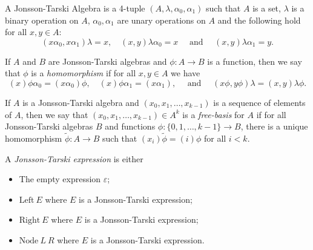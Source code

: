 \begin{definition}\label{def:Jonsson-Tarski_Algebra}
    A Jonsson-Tarski Algebra is a 4-tuple \((A,\lambda,\alpha_0,\alpha_1)\) such that \(A\) is a set, \(\lambda\) is a binary operation on \(A\), \(\alpha_0, \alpha_1\) are unary operations on \(A\) and the following hold for all \(x,y\in A\):
    \[(x\alpha_0, x\alpha_1)\lambda = x, \quad (x,y)\lambda\alpha_0=x \quad \text{ and }\quad(x,y)\lambda\alpha_1=y.\]
\end{definition}
\begin{definition}\label{def:jt_homomorphism}
    If \(A\) and \(B\) are Jonsson-Tarski algebras and \(\phi:A\to B\) is a function, then we say that \(\phi\) is a \emph{homomorphism} if for all \(x,y\in A \) we have
    \[(x)\phi\alpha_0=(x\alpha_0)\phi, \quad (x)\phi\alpha_1=(x\alpha_1), \quad \text{ and }\quad (x\phi,y\phi )\lambda= (x,y)\lambda \phi.\]
\end{definition}
\begin{definition}\label{def:free_basis_jt}
If \(A\) is a Jonsson-Tarski algebra and \((x_0, x_1,\ldots, x_{k-1})\) is a sequence of elements of \(A\), then we say that \((x_0, x_1,\ldots, x_{k-1})\in A^k\) is a \emph{free-basis} for \(A\) if for all Jonsson-Tarski algebras \(B\) and functions \(\phi:\{0,1,\ldots, k-1\}\to B\), there is a unique homomorphism \(\tilde{\phi}:A \to B\) such that \((x_i)\tilde{\phi}=(i)\phi\) for all \(i<k\).
\end{definition}

\begin{definition}\label{def:jt_expression}

A \emph{Jonsson-Tarski expression} is either
\begin{itemize}
    \item The empty expression \(
    \varepsilon
    \);
    \item \(\text{Left}\ E\) where \(E\) is a Jonsson-Tarski expression;
    \item \(\text{Right}\ E\) where \(E\) is a Jonsson-Tarski expression;
    \item \(\text{Node}\ L\ R\) where \(E\) is a Jonsson-Tarski expression.
\end{itemize}
\end{definition}


